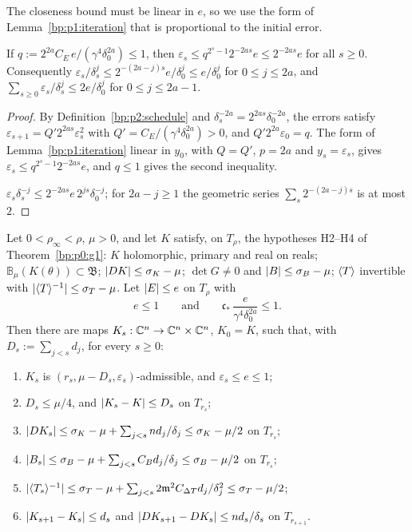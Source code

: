 The closeness bound must be linear in $e$, so we use the form of Lemma~\ref{bp:p1:iteration} that is
proportional to the initial error.

\begin{lemma}\label{bp:p2:error-decay}
If $q:=2^{2a}C_E\,e/(\gamma^4\delta_0^{2a})\le1$, then $\varepsilon_s\le q^{2^s-1}2^{-2as}e\le2^{-2as}e$ for
all $s\ge0$. Consequently $\varepsilon_s/\delta_s^j\le2^{-(2a-j)s}e/\delta_0^j\le e/\delta_0^j$ for
$0\le j\le2a$, and $\sum_{s\ge0}\varepsilon_s/\delta_s^j\le2e/\delta_0^j$ for $0\le j\le2a-1$.
\end{lemma}

\begin{proof}
\label{step:p2:ed-errors}
By Definition~\ref{bp:p2:schedule} and $\delta_s^{-2a}=2^{2as}\delta_0^{-2a}$, the errors satisfy
$\varepsilon_{s+1}=Q'2^{2as}\varepsilon_s^2$ with $Q'=C_E/(\gamma^4\delta_0^{2a})>0$, and $Q'2^{2a}\varepsilon_0=q$.
The form of Lemma~\ref{bp:p1:iteration} linear in $y_0$, with $Q=Q'$, $p=2a$ and $y_s=\varepsilon_s$, gives
$\varepsilon_s\le q^{2^s-1}2^{-2as}e$, and $q\le1$ gives the second inequality.

\label{step:p2:ed-sums}
$\varepsilon_s\delta_s^{-j}\le2^{-2as}e\,2^{js}\delta_0^{-j}$; for $2a-j\ge1$ the geometric series
$\sum_s2^{-(2a-j)s}$ is at most $2$.
\end{proof}

\begin{proposition}\label{bp:p2:iteration}
Let $0<\rho_\infty<\rho$, $\mu>0$, and let $K$ satisfy, on $T_\rho$, the hypotheses H2--H4 of
Theorem~\ref{bp:p0:g1}: $K$ holomorphic, primary and real on reals; $\mathbb B_\mu(K(\theta))\subset
\mathfrak B$; $\lvert DK\rvert\le\sigma_K-\mu$; $\det G\ne0$ and $\lvert B\rvert\le\sigma_B-\mu$; $\langle T\rangle$ invertible with
$\lvert \langle T\rangle^{-1}\rvert\le\sigma_T-\mu$. Let $\lvert E\rvert\le e$ on $T_\rho$ with
\[
e\le1\qquad\text{and}\qquad\mathfrak c_*\,\frac{e}{\gamma^4\delta_0^{2a}}\le1.
\]
Then there are maps $K_s:\mathbb{C}^n\to\mathbb{C}^n\times\mathbb{C}^n$, $K_0=K$, such that, with $D_s:=\sum_{j<s}d_j$, for every
$s\ge0$:
\begin{enumerate}[label=(\roman*)]
\item $K_s$ is $(r_s,\mu-D_s,\varepsilon_s)$-admissible, and $\varepsilon_s\le e\le1$;
\item $D_s\le\mu/4$, and $\lvert K_s-K\rvert\le D_s$ on $T_{r_s}$;
\item $\lvert DK_s\rvert\le\sigma_K-\mu+\sum_{j<s}nd_j/\delta_j\le\sigma_K-\mu/2$ on $T_{r_s}$;
\item $\lvert B_s\rvert\le\sigma_B-\mu+\sum_{j<s}C_Bd_j/\delta_j\le\sigma_B-\mu/2$ on $T_{r_s}$;
\item $\lvert \langle T_s\rangle^{-1}\rvert\le\sigma_T-\mu+\sum_{j<s}2\mathfrak m^2C_{\Delta T}d_j/\delta_j^2\le\sigma_T-
  \mu/2$;
\item $\lvert K_{s+1}-K_s\rvert\le d_s$ and $\lvert DK_{s+1}-DK_s\rvert\le nd_s/\delta_s$ on $T_{r_{s+1}}$.
\end{enumerate}
\end{proposition}

